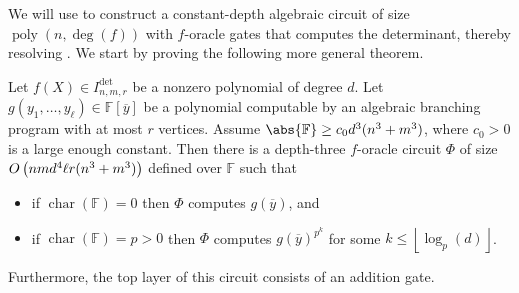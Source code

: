 \documentclass[10pt,a4paper]{amsart}
\DeclareMathOperator{\characteristic}{char}
\DeclareMathOperator{\poly}{poly}
\newcommand*\F{\mathbb{F}}
\newcommand*\floor[1]{%
    \left\lfloor #1 \right\rfloor
}
\newcommand*\bigO[1]{%
    O\kern-0.0pt\left(#1\right)
}
\begin{document}
We will use  to construct a constant-depth algebraic circuit of size $\poly(n,\deg(f))$ with $f$-oracle gates that computes the determinant, thereby resolving . We start by proving the following more general theorem.
\begin{thrm}\label{thrm:ABP_det_oracle}
    Let $f(X) \in I^{\det}_{n, m, r}$ be a nonzero polynomial of degree $d$.
    Let $g(y_1, \ldots, y_\ell) \in \F[\overline{y}]$ be a polynomial computable by an algebraic branching program with at most $r$ vertices.
    Assume $\abs{\F} \geq c_0 d^3(n^3+m^3)$, where $c_0>0$ is a large enough constant.
    Then there is a depth-three $f$-oracle circuit $\Phi$ of size $\bigO{nmd^4\ell r(n^3+m^3)}$ defined over $\F$ such that 
    \begin{itemize}
        \item if $\characteristic(\F) = 0$ then $\Phi$ computes $g(\overline{y})$, and
        \item if $\characteristic(\F) = p > 0$ then $\Phi$ computes $g(\overline{y})^{p^k}$ for some $k \leq \floor{\log_p(d)}$.
    \end{itemize}
    Furthermore, the top layer of this circuit consists of an addition gate.
\end{thrm}
\end{document}

